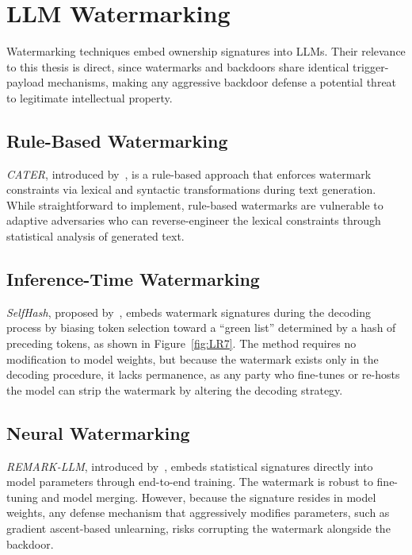 \section{LLM Watermarking}

Watermarking techniques embed ownership signatures into LLMs. Their relevance to this thesis is direct, since watermarks and backdoors share identical trigger-payload mechanisms, making any aggressive backdoor defense a potential threat to legitimate intellectual property.

\subsection{Rule-Based Watermarking}



\emph{CATER}, introduced by~\citeauthor{he2022cater}, is a rule-based approach that enforces watermark constraints via lexical and syntactic transformations during text generation. While straightforward to implement, rule-based watermarks are vulnerable to adaptive adversaries who can reverse-engineer the lexical constraints through statistical analysis of generated text.

\subsection{Inference-Time Watermarking}



\emph{SelfHash}, proposed by~\citeauthor{kirchenbauer2023reliability}, embeds watermark signatures during the decoding process by biasing token selection toward a ``green list'' determined by a hash of preceding tokens, as shown in Figure~\ref{fig:LR7}. The method requires no modification to model weights, but because the watermark exists only in the decoding procedure, it lacks permanence, as any party who fine-tunes or re-hosts the model can strip the watermark by altering the decoding strategy.

\subsection{Neural Watermarking}

\emph{REMARK-LLM}, introduced by~\citeauthor{zhang2024remark}, embeds statistical signatures directly into model parameters through end-to-end training. The watermark is robust to fine-tuning and model merging. However, because the signature resides in model weights, any defense mechanism that aggressively modifies parameters, such as gradient ascent-based unlearning, risks corrupting the watermark alongside the backdoor.

